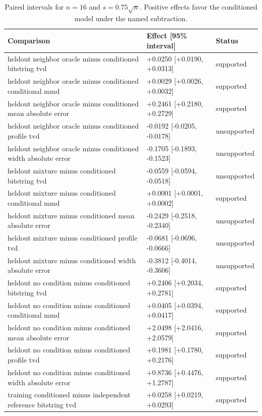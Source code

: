 \begin{table}[p]
\centering
\scriptsize
\setlength{\tabcolsep}{4pt}
\caption{Paired intervals for $n=16$ and $s=0.75\sqrt n$. Positive effects favor the conditioned model under the named subtraction.}
\label{tab:all-intervals-n16-w0.75}
\begin{tabular}{@{}p{}p{}p{}@{}}
\toprule
Comparison & Effect [95\% interval] & Status\\
\midrule
heldout neighbor oracle minus conditioned bitstring tvd & +0.0250 [+0.0190, +0.0313] & supported \\
heldout neighbor oracle minus conditioned conditional mmd & +0.0029 [+0.0026, +0.0032] & supported \\
heldout neighbor oracle minus conditioned mean absolute error & +0.2461 [+0.2180, +0.2729] & supported \\
heldout neighbor oracle minus conditioned profile tvd & -0.0192 [-0.0205, -0.0178] & unsupported \\
heldout neighbor oracle minus conditioned width absolute error & -0.1705 [-0.1893, -0.1523] & unsupported \\
heldout mixture minus conditioned bitstring tvd & -0.0559 [-0.0594, -0.0518] & unsupported \\
heldout mixture minus conditioned conditional mmd & +0.0001 [+0.0001, +0.0002] & supported \\
heldout mixture minus conditioned mean absolute error & -0.2429 [-0.2518, -0.2340] & unsupported \\
heldout mixture minus conditioned profile tvd & -0.0681 [-0.0696, -0.0666] & unsupported \\
heldout mixture minus conditioned width absolute error & -0.3812 [-0.4014, -0.3606] & unsupported \\
heldout no condition minus conditioned bitstring tvd & +0.2406 [+0.2034, +0.2781] & supported \\
heldout no condition minus conditioned conditional mmd & +0.0405 [+0.0394, +0.0417] & supported \\
heldout no condition minus conditioned mean absolute error & +2.0498 [+2.0416, +2.0579] & supported \\
heldout no condition minus conditioned profile tvd & +0.1981 [+0.1780, +0.2176] & supported \\
heldout no condition minus conditioned width absolute error & +0.8736 [+0.4476, +1.2787] & supported \\
training conditioned minus independent reference bitstring tvd & +0.0258 [+0.0219, +0.0293] & supported \\

\end{tabular}
\end{table}
